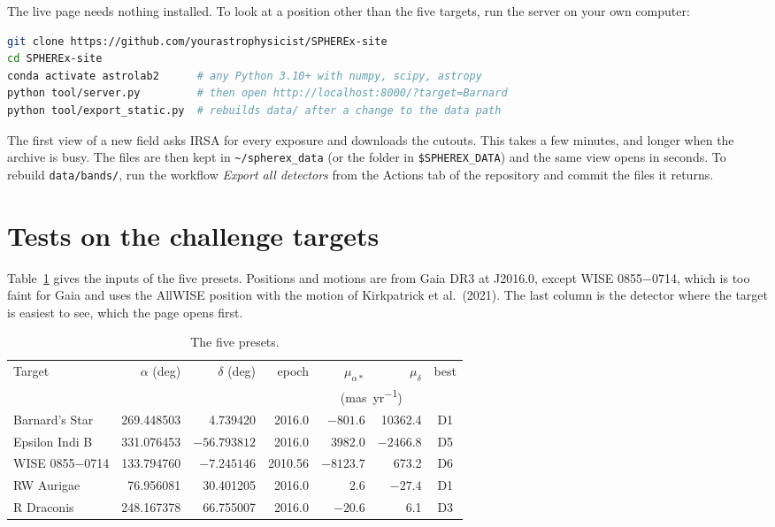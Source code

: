 \documentclass[11pt,a4paper]{article}
\begin{document}
The live page needs nothing installed. To look at a position other than the five targets, run
the server on your own computer:
\begin{lstlisting}[language=bash]
git clone https://github.com/yourastrophysicist/SPHEREx-site
cd SPHEREx-site
conda activate astrolab2      # any Python 3.10+ with numpy, scipy, astropy
python tool/server.py         # then open http://localhost:8000/?target=Barnard
python tool/export_static.py  # rebuilds data/ after a change to the data path
\end{lstlisting}
The first view of a new field asks IRSA for every exposure and downloads the cutouts. This takes
a few minutes, and longer when the archive is busy. The files are then kept in
\texttt{\textasciitilde/spherex\_data} (or the folder in \texttt{\$SPHEREX\_DATA}) and the same
view opens in seconds. To rebuild \texttt{data/bands/}, run the workflow \emph{Export all
detectors} from the Actions tab of the repository and commit the files it returns.

\section{Tests on the challenge targets}

Table~\ref{tab:targets} gives the inputs of the five presets. Positions and motions are from
Gaia DR3 at J2016.0, except WISE 0855$-$0714, which is too faint for Gaia and uses the AllWISE
position with the motion of Kirkpatrick et al.\ (2021). The last column is the detector where
the target is easiest to see, which the page opens first.

\begin{table}[h]
\centering
\small
\begin{tabular}{@{}lrrrrrc@{}}
\toprule
Target & $\alpha$ (deg) & $\delta$ (deg) & epoch & $\mu_{\alpha*}$ & $\mu_\delta$ & best \\
 & & & & \multicolumn{2}{c}{(\si{mas.yr^{-1}})} & \\
\midrule
Barnard's Star   & 269.448503 &   4.739420 & 2016.0  &  $-801.6$ & 10362.4 & D1 \\
Epsilon Indi B   & 331.076453 & $-56.793812$ & 2016.0  &  3982.0 & $-2466.8$ & D5 \\
WISE 0855$-$0714 & 133.794760 &  $-7.245146$ & 2010.56 & $-8123.7$ &  673.2 & D6 \\
RW Aurigae       &  76.956081 &  30.401205 & 2016.0  &     2.6 &  $-27.4$ & D1 \\
R Draconis       & 248.167378 &  66.755007 & 2016.0  &  $-20.6$ &    6.1 & D3 \\
\bottomrule
\end{tabular}
\caption{The five presets.}
\label{tab:targets}
\end{table}
\end{document}
